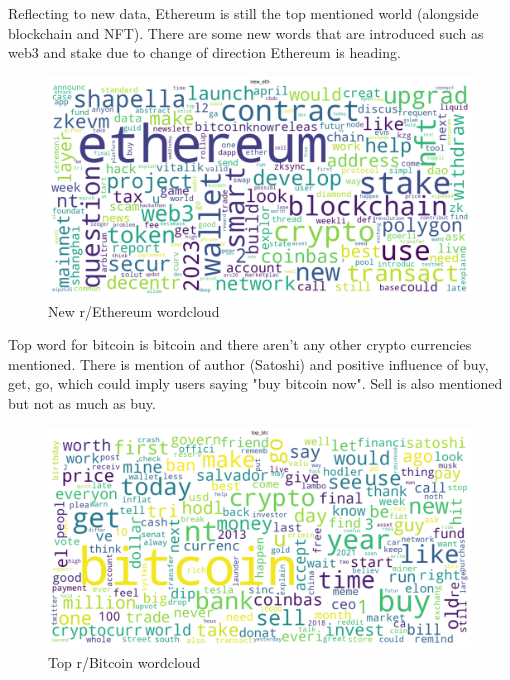 \begin{landscape}
Reflecting to new data, Ethereum is still the top mentioned world (alongside blockchain and NFT). There are some new words that are introduced such as web3 and stake due to change of direction Ethereum is heading.

\begin{figure}[H]
\includegraphics[scale=0.55]{img/B1/new_eth_wordcloud.png}
\centering
\caption{New r/Ethereum wordcloud}
\label{fig:new_eth_wordcloud}
\end{figure}
\end{landscape}

\begin{landscape}
Top word for bitcoin is bitcoin and there aren't any other crypto currencies mentioned. There is mention of author (Satoshi) and positive influence of buy, get, go, which could imply users saying "buy bitcoin now". Sell is also mentioned but not as much as buy.

\begin{figure}[H]
\includegraphics[scale=0.55]{img/B1/top_btc_wordcloud.png}
\centering
\caption{Top r/Bitcoin wordcloud}
\label{fig:top_btc_wordcloud}
\end{figure}
\end{landscape}

